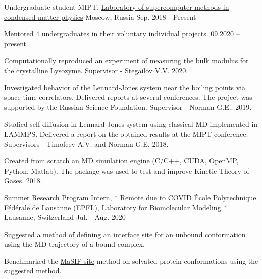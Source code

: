 

\begin{cventries}

  \cventry
    {Undergraduate student} %
    {MIPT, \href{http://en.smcmp.ru/}{Laboratory of supercomputer methods
in condensed matter physics}} %
    {Moscow, Russia} %
    {Sep. 2018 - Present} %
    {
      \begin{cvitems} %
        \item {\textsf{Mentored 4} \textsf{undergraduates} in their voluntary individual projects. 09.2020 -- present}
        \item {Computationally reproduced an experiment of measuring the bulk modulus for the \textsf{crystalline Lysozyme}. Supervisor - Stegailov V.V. 2020.}
        \item {Investigated behavior of the \textsf{Lennard-Jones system} near the boiling points via space-time correlators. Delivered reports at \textsf{several conferences}. The project was supported by the Russian Science Foundation. Supervisor - Norman G.E.. 2019.}
      	\item {Studied self-diffusion in Lennard-Jones system using classical MD implemented in \textsf{LAMMPS}. Delivered a report on the obtained results at the MIPT conference. Supervisors - Timofeev A.V. and Norman G.E. 2018.}
      	\item {\href{https://github.com/PolyachenkoYA/molecules}{Created} from scratch an MD simulation engine (\textsf{C/C++, CUDA, OpenMP, Python, Matlab}). The package was used to test and improve Kinetic Theory of Gases.  2018.}
      \end{cvitems}
    }
    
  \cventry
    {Summer Research Program Intern, * Remote due to COVID} %
    {École Polytechnique Fédérale de Lausanne (\href{https://www.epfl.ch/en/}{EPFL}), \hspace{5pt}  \href{https://www.epfl.ch/labs/lbm/}{Laboratory for Biomolecular Modeling}} %
    {* Lausanne, Switzerland} %
    {Jul. - Aug. 2020} %
    {
      \begin{cvitems} %
		\item{Suggested a method of defining an interface site for an unbound conformation using the MD trajectory of a bound complex.}
        \item {Benchmarked the \href{https://www.nature.com/articles/s41592-019-0666-6}{MaSIF-site} method on solvated protein conformations using the suggested method.}
      \end{cvitems}
    }
    

\end{cventries}
